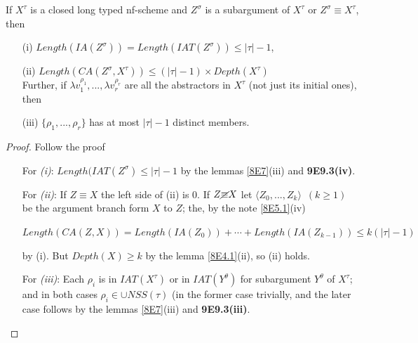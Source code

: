 \documentclass[a4paper,10pt]{article}
\begin{document}
\begin{col} If $X^{\tau}$ is a closed long typed nf-scheme and $Z^{\sigma}$ is a subargument of $X^{\tau}$ or $Z^{\sigma} \equiv X^{\tau}$, then
\begin{itemize}
 \item[(i)] $Length(IA(Z^{\sigma})) = Length(IAT(Z^{\sigma})) \leq |\tau| - 1$,
 \item[(ii)] $Length(CA(Z^{\sigma},X^{\tau})) \leq (|\tau| - 1) \times Depth(X^{\tau})$\\
 Further, if $\lambda v_1^{\rho_1}, ..., \lambda v_r^{\rho_r}$ are all the abstractors in $X^{\tau}$ (not just its initial ones), then
 \item[(iii)] $\{\rho_1, ..., \rho_r\}$ has at most $|\tau| - 1$ distinct members.
\end{itemize}
\begin{proof} Follow the proof
\begin{itemize}
 \item[For {\em (i)}:] $Length(IAT(Z^{\sigma}) \leq |\tau | - 1$ by the lemmas \ref{8E7}(iii) and \textbf{9E9.3(iv)}.
 
 \item[For {\em(ii)}:] If $Z \equiv X$ the left side of (ii) is $0$. If $Z \cancel{\equiv} X$ let $\langle Z_0,...,Z_k\rangle\,\,\,(k\geq 1)$
 be the argument branch form $X$ to $Z$; the, by the note \ref{8E5.1}(iv)
 \begin{center}
  $Length(CA(Z,X)) = Length(IA(Z_0))+\cdots + Length(IA(Z_{k-1})) \leq k(|\tau | - 1)$
 \end{center}
by (i). But $Depth(X) \geq k$ by the lemma \ref{8E4.1}(ii), so (ii) holds.
 \item[For {\em (iii)}:] Each $\rho_i$ is in $IAT(X^{\tau})$ or in $IAT(Y^{\theta})$ for subargument $Y^{\theta}$ of $X^{\tau}$; and
 in both cases $\rho_i \in \cup NSS(\tau)$ (in the former case trivially, and the later case follows by the lemmas \ref{8E7}(iii) and \textbf{9E9.3(iii)}.
\end{itemize}

\end{proof}
\end{col}
\end{document}
